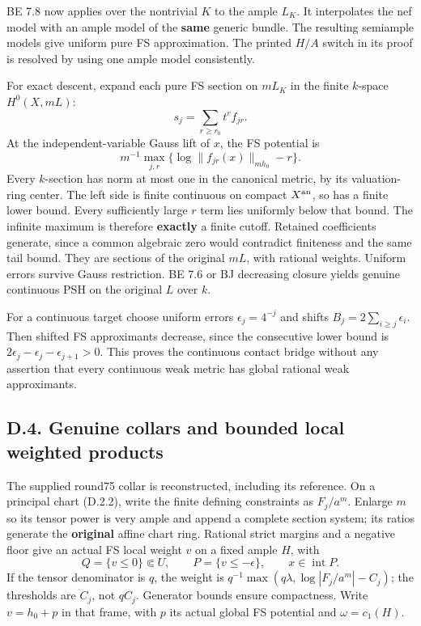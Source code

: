\documentclass[
  10pt,
]{article}
\begin{document}
BE 7.8 now applies over the nontrivial \(K\) to the ample \(L_K\). It
interpolates the nef model with an ample model of the \textbf{same}
generic bundle. The resulting semiample models give uniform pure FS
approximation. The printed \(H/A\) switch in its proof is resolved by
using one ample model consistently.

For exact descent, expand each pure FS section on \(mL_K\) in the finite
\(k\)-space \(H^0(X,mL)\): \[s_j=\sum_{r\ge r_0}t^r f_{jr}.\] At the
independent-variable Gauss lift of \(x\), the FS potential is
\[m^{-1}\max_{j,r}\{\log\|f_{jr}(x)\|_{mh_0}-r\}. \tag{D.3.1}\] Every
\(k\)-section has norm at most one in the canonical metric, by its
valuation-ring center. The left side is finite continuous on compact
\(X^{\rm an}\), so has a finite lower bound. Every sufficiently large
\(r\) term lies uniformly below that bound. The infinite maximum is
therefore \textbf{exactly} a finite cutoff. Retained coefficients
generate, since a common algebraic zero would contradict finiteness and
the same tail bound. They are sections of the original \(mL\), with
rational weights. Uniform errors survive Gauss restriction. BE 7.6 or BJ
decreasing closure yields genuine continuous PSH on the original \(L\)
over \(k\).

For a continuous target choose uniform errors \(\epsilon_j=4^{-j}\) and
shifts \(B_j=2\sum_{i\ge j}\epsilon_i\). Then shifted FS approximants
decrease, since the consecutive lower bound is
\(2\epsilon_j-\epsilon_j-\epsilon_{j+1}>0\). This proves the continuous
contact bridge without any assertion that every continuous weak metric
has global rational weak approximants.

\subsection{D.4. Genuine collars and bounded local weighted
products}\label{d.4.-genuine-collars-and-bounded-local-weighted-products}

The supplied round75 collar is reconstructed, including its reference.
On a principal chart (D.2.2), write the finite defining constraints as
\(F_j/a^m\). Enlarge \(m\) so its tensor power is very ample and append
a complete section system; its ratios generate the \textbf{original}
affine chart ring. Rational strict margins and a negative floor give an
actual FS local weight \(v\) on a fixed ample \(H\), with
\[Q=\{v\le0\}\Subset U,\qquad P=\{v\le-\epsilon\},\qquad x\in\operatorname{int}P.\]
If the tensor denominator is \(q\), the weight is
\(q^{-1}\max(q\lambda,\log|F_j/a^m|-C_j)\); the thresholds are \(C_j\),
not \(qC_j\). Generator bounds ensure compactness. Write \(v=h_0+p\) in
that frame, with \(p\) its actual global FS potential and
\(\omega=c_1(H)\).
\end{document}
